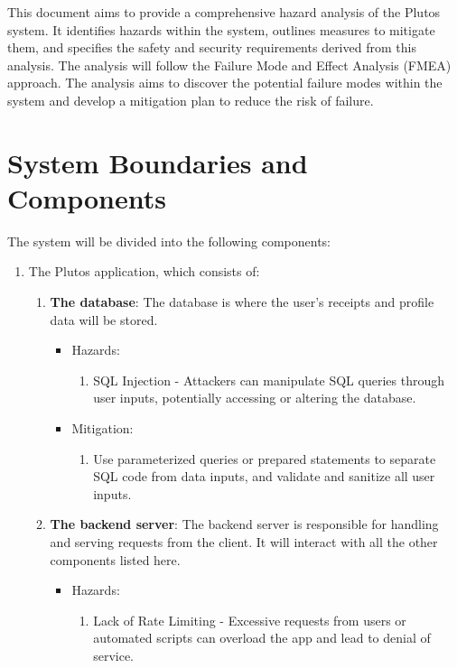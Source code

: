 \documentclass{article}
\begin{document}
This document aims to provide a comprehensive hazard analysis of the Plutos
system. It identifies hazards within the system, outlines measures to mitigate
them, and specifies the safety and security requirements derived from this
analysis. The analysis will follow the Failure Mode and Effect Analysis (FMEA)
approach. The analysis aims to discover the potential failure modes within the
system and develop a mitigation plan to reduce the risk of failure. 


\section{System Boundaries and Components}

The system will be divided into the following components:
\begin{enumerate}
    \item The Plutos application, which consists of:
    \begin{enumerate}
        \item \textbf{The database}: The database is where the user's receipts
        and profile data will be stored.
		\begin{itemize}
			\item Hazards:
				\begin{enumerate}
					\item SQL Injection - Attackers can manipulate SQL queries through user inputs, potentially accessing or altering the database.
				\end{enumerate}
			\item Mitigation:
				\begin{enumerate}
					\item Use parameterized queries or prepared statements to separate SQL code from data inputs, and validate and sanitize all user inputs.
				\end{enumerate}
		\end{itemize}
        \item \textbf{The backend server}: The backend server is responsible for
        handling and serving requests from the client. It will interact with all
        the other components listed here.
		\begin{itemize}
			\item Hazards:
				\begin{enumerate}
					\item Lack of Rate Limiting - Excessive requests from users or automated scripts can overload the app and lead to denial of service.

\end{enumerate}
\end{itemize}
\end{enumerate}
\end{enumerate}
\end{document}
